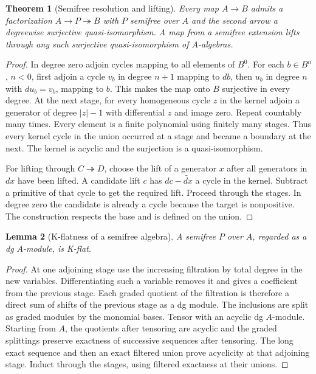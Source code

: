 \documentclass[11pt,oneside,openany]{book}
\newtheorem{theorem}{Theorem}[chapter]
\newtheorem{lemma}[theorem]{Lemma}
\theoremstyle{definition}
\theoremstyle{remark}
\begin{document}
\begin{theorem}[Semifree resolution and lifting]\label{res:A02}
Every map \(A\to B\) admits a factorization
\(A\to P\twoheadrightarrow B\) with \(P\) semifree over \(A\)
and the second arrow a degreewise surjective quasi-isomorphism.
A map from a semifree extension lifts through any such surjective
quasi-isomorphism of \(A\)-algebras.
\end{theorem}
\begin{proof}
In degree zero adjoin cycles mapping to all elements of \(B^0\).
For each \(b\in B^n\), \(n<0\), first adjoin a cycle \(v_b\)
in degree \(n+1\) mapping to \(db\), then \(u_b\) in degree \(n\)
with \(du_b=v_b\), mapping to \(b\). This makes the map onto \(B\)
surjective in every degree. At the next stage, for every homogeneous
cycle \(z\) in the kernel adjoin a generator of degree \(|z|-1\)
with differential \(z\) and image zero. Repeat countably many times.
Every element is a finite polynomial using finitely many stages.
Thus every kernel cycle in the union occurred at a stage and became
a boundary at the next. The kernel is acyclic and the surjection is
a quasi-isomorphism.

For lifting through \(C\twoheadrightarrow D\), choose the lift of a
generator \(x\) after all generators in \(dx\) have been lifted.
A candidate lift \(c\) has \(dc-\widetilde{dx}\) a cycle in the kernel.
Subtract a primitive of that cycle to get the required lift. Proceed
through the stages. In degree zero the candidate is already a cycle
because the target is nonpositive. The construction respects the base
and is defined on the union.
\end{proof}

\begin{lemma}[K-flatness of a semifree algebra]\label{res:A03}
A semifree \(P\) over \(A\), regarded as a dg \(A\)-module,
is K-flat.
\end{lemma}
\begin{proof}
At one adjoining stage use the increasing filtration by total degree
in the new variables. Differentiating such a variable removes it and
gives a coefficient from the previous stage. Each graded quotient of
the filtration is therefore a direct sum of shifts of the previous
stage as a dg module. The inclusions are split as graded modules by
the monomial bases. Tensor with an acyclic dg \(A\)-module. Starting
from \(A\), the quotients after tensoring are acyclic and the graded
splittings preserve exactness of successive sequences after tensoring.
The long exact sequence and then an exact filtered union prove
acyclicity at that adjoining stage. Induct through the stages, using
filtered exactness at their unions.
\end{proof}
\end{document}
